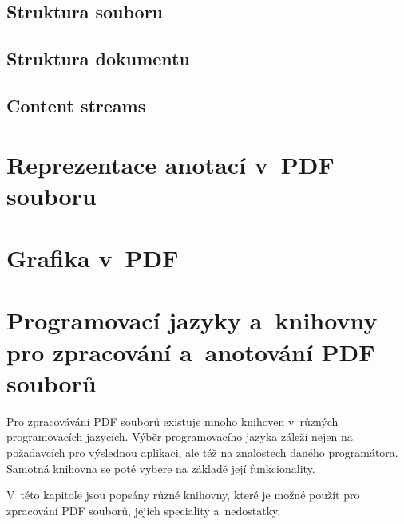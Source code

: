 

\subsection*{Struktura souboru}


\subsection*{Struktura dokumentu}


\subsection*{Content streams}


\section{Reprezentace anotací v~PDF souboru}

\DummyText



\section{Grafika v~PDF}

\cite{PDF32000-1:2008}
\DummyText



\section{Programovací jazyky a~knihovny pro zpracování a~anotování PDF souborů}

Pro zpracovávání PDF souborů existuje mnoho knihoven v~různých programovacích
jazycích. Výběr programovacího jazyka záleží nejen na požadavcích pro výslednou
aplikaci, ale též na znalostech daného programátora. Samotná knihovna se poté
vybere na základě její funkcionality. 

V~této kapitole jsou popsány různé knihovny, které je možné použít pro zpracování
PDF souborů, jejich speciality a~nedostatky.


